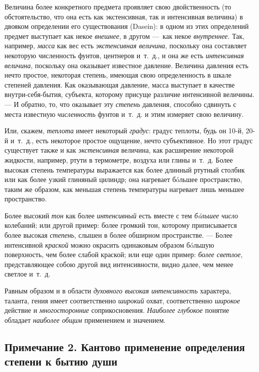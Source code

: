 {Величина более конкретного предмета проявляет свою двойственность (то
обстоятельство, что она есть как экстенсивная, так и интенсивная величина)
в двояком определении его существования (Dasein): в одном из этих
определений предмет выступает как некое {\em внешнее},
в другом —~как некое {\em внутреннее}. Так, например,
{\em масса} как вес есть
{\em экстенсивная величина}, поскольку она составляет
некоторую численность фунтов, центнеров и~т.~д., и она же есть
{\em интенсивная величина}, поскольку она оказывает
известное давление. Величина давления есть нечто простое, некоторая
степень, имеющая свою определенность в шкале степеней давления. Как
оказывающая давление, масса выступает в качестве внутри-себя-бытия,
субъекта, которому присуще различие интенсивной величины. — И обратно, то,
что оказывает эту {\em степень} давления, способно
сдвинуть с места известную {\em численность} фунтов
и~т.~д. и этим измеряет свою величину.

Или, скажем, {\em теплота} имеет некоторый
{\em градус}: градус теплоты, будь он 10-й, 20-й
и~т.~д., есть некоторое простое ощущение, нечто субъективное. Но этот
градус существует также и как {\em экстенсивная}
величина, как расширение некоторой жидкости, например, ртути в термометре,
воздуха или глины и~т.~д. Более высокая степень температуры выражается как
более длинный ртутный столбик или как более узкий глиняный цилиндр; она
нагревает бóльшее пространство, таким же образом, как меньшая степень
температуры нагревает лишь меньшее пространство.

Более высокий {\em тон} как более
{\em интенсивный} есть вместе с тем
{\em бóльшее число} колебаний; или другой пример: более
громкий тон, которому приписывается более высокая
{\em степень}, слышен в более обширном пространстве. —
Более интенсивной {\em краской} можно окрасить
одинаковым образом бóльшую поверхность, чем более слабой краской; или еще
один пример: {\em более светлое}, представляющее собою
другой вид интенсивности, видно далее, чем менее светлое и~т.~д.

Равным образом и в области {\em духовного высокая
интенсивность} характера, таланта, гения имеет соответственно
{\em широкий} охват, соответственно
{\em широкое} действие и
{\em многосторонние} соприкосновения.
{\em Наиболее глубокое} понятие обладает
{\em наиболее общим} применением и значением.

\subsection*{Примечание 2. Кантово применение определения степени
к бытию души}

}
